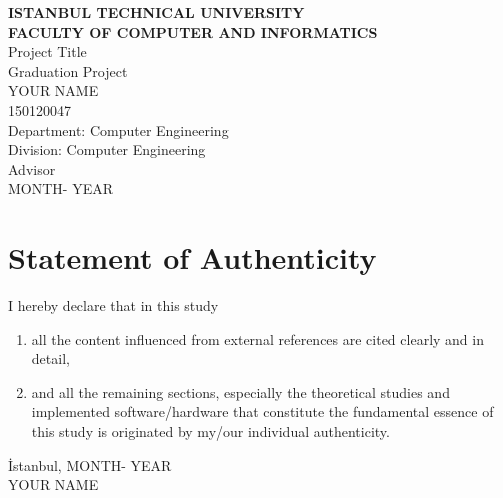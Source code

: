 \documentclass[a4paper, 12pt, titlepage]{article}
\title{\thetitle}
\author{\theauthor}
\date{\thedate}
\newcommand{\thetitle}{Project Title}
\newcommand{\theauthor}{YOUR NAME}
\newcommand{\thedate}{MONTH- YEAR}
\newcommand{\theturkishdate}{MONTH- YEAR}
\begin{document}
\shorthandoff{=}


\begin{titlepage}
    \bfseries %
    \sffamily %
    \begin{center}
        \LARGE{\textbf{ISTANBUL TECHNICAL UNIVERSITY \\
               FACULTY OF COMPUTER AND INFORMATICS} } \\
        \vspace{5.5cm}
        \LARGE{\thetitle}  \\
        \vspace{4.5cm}
        \Large{Graduation Project} \\
        \vspace{0.5cm}
        \Large{\theauthor} \\
        \Large{150120047} \\
        \vspace{4cm}
        \large{Department: Computer Engineering} \\
        \large{Division: Computer Engineering} \\
        \vspace{1.5cm}
        \large{Advisor} \\
        \vspace{\fill} %
        \large{\normalfont \sffamily \thedate}
    \end{center}
\end{titlepage}

\newpage
\section*{Statement of Authenticity}

I hereby declare that in this study

\begin{enumerate}
    \item all the content influenced from external references are cited clearly and in detail,
    \item and all the remaining sections, especially the theoretical studies and implemented software/hardware that constitute the fundamental essence of this study is originated by my/our individual authenticity.
\end{enumerate}
\vspace{1em}
İstanbul, \theturkishdate
\vspace{3em}\\ \theauthor
\end{document}
